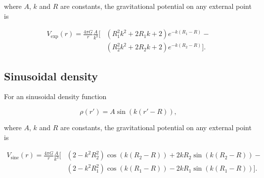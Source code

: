 \documentclass[extra, referee]{gji}
\begin{document}
\noindent
where $A$, $k$ and $R$ are constants, the gravitational potential on any external point
is

\begin{equation}
    \begin{split}
    V_\text{exp}(r) = \frac{4\pi G}{r} \frac{A}{k^3} \Big[
    & \left( R_1^2 k^2 + 2 R_1 k + 2 \right) e^{- k (R_1 - R)} - \\
    & \left( R_2^2 k^2 + 2 R_2 k + 2 \right) e^{- k (R_2 - R)}
    \Big].
    \end{split}
\end{equation}


\subsection{Sinusoidal density}

For an sinusoidal density function

\begin{equation}
    \rho(r') = A \sin ( k (r' - R)),
\end{equation}

\noindent
where $A$, $k$ and $R$ are constants, the gravitational potential on any external point
is

\begin{equation}
    \begin{split}
    V_\text{sine}(r) = \frac{4\pi G}{r} \frac{A}{k^3} \Big[
    & (2 - k^2 R_2^2) \cos(k(R_2 - R)) + 2 k R_2 \sin(k(R_2 - R)) - \\
    & (2 - k^2 R_1^2) \cos(k(R_1 - R)) - 2 k R_1 \sin(k(R_1 - R))
        \Big].
    \end{split}
\end{equation}
\end{document}
